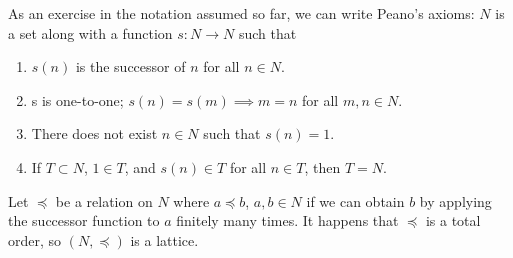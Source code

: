 
As an exercise in the notation assumed so far, we can write Peano's axioms: $N$ is a set along with a function $s: N \to N$ such that
\begin{enumerate}
  \item $s(n)$ is the successor of $n$ for all $n \in N$.
  \item s is one-to-one; $s(n) = s(m) \implies m = n$  for all $m, n \in N$.
  \item There does not exist $n \in N$ such that $s(n) = 1$.
  \item If $T \subset N$, $1 \in T$, and $s(n) \in T$ for all $n \in T$, then $T = N$.
\end{enumerate}


Let $\preceq$ be a relation on $N$ where $a \preceq b$, $a, b \in N$ if we can obtain $b$ by applying the successor function to $a$ finitely many times.
It happens that $\preceq$ is a total order, so $(N, \preceq)$ is a lattice.

\strats
